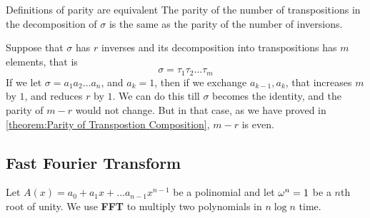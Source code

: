 \theo{}
{Definitions of parity are equivalent}{
    The parity of the number of transpositions in the decomposition of
    $\sigma$ is the same as the parity of the number of inversions.
}

\begin{prooof}
    Suppose that $\sigma$ has $r$ inverses and its decomposition into
    transpositions has $m$ elements, that is
    \[\sigma = \tau_1\tau_2\dots \tau_m\] 
    If we let $\sigma = a_1a_2\dots a_n$, and $a_k =1$, then if we exchange
    $a_{k-1}, a_k$, that increases $m$ by $1$, and reduces $r$ by $1$. We can
    do this till $\sigma$ becomes the identity, and the parity of $m-r$ would
    not change. But in that case, as we have proved in \autoref{theorem:Parity
    of Transpostion Composition}, $m-r$ is even.
\end{prooof}




\subsection{Fast Fourier Transform}

Let $ A(x) = a_0 + a_1x + \dots a_{n-1}x^{n-1} $ be a polinomial and let $
\omega^n = 1 $ be a $ n $th root of unity. We use \textbf{FFT} to multiply two
polynomials in $ n\log n $ time.

